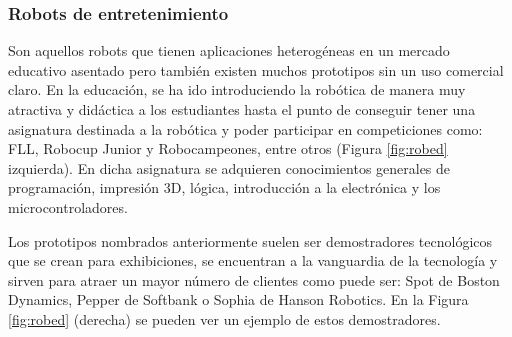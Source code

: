 \subsubsection{Robots de entretenimiento}

Son aquellos robots que tienen aplicaciones heterogéneas en un mercado educativo asentado pero también existen muchos prototipos sin un uso comercial claro. En la educación, se ha ido introduciendo la robótica de manera muy atractiva y didáctica a los estudiantes hasta el punto de conseguir tener una asignatura destinada a la robótica y poder participar en competiciones como: \ac{FLL}, Robocup Junior y Robocampeones, entre otros (Figura \ref{fig:robed} izquierda).  En dicha asignatura se adquieren conocimientos generales de programación, impresión 3D, lógica, introducción a la electrónica y los microcontroladores.

Los prototipos nombrados anteriormente suelen ser demostradores tecnológicos que se crean para exhibiciones, se encuentran a la vanguardia de la tecnología y sirven para atraer un mayor número de clientes como puede ser: Spot de Boston Dynamics, Pepper de Softbank o Sophia de Hanson Robotics. En la Figura \ref{fig:robed} (derecha) se pueden ver un ejemplo de estos demostradores.\\


